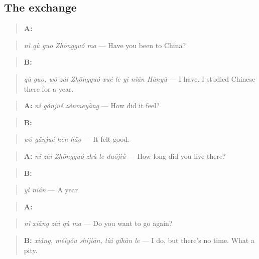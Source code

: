 \subsection*{The exchange}
\begin{quote}
\textbf{A:} 
\end{quote}

\begin{quote}
\emph{nǐ qù guo Zhōngguó ma} — Have you been to China?
\end{quote}

\begin{quote}
\textbf{B:}  
\end{quote}

\begin{quote}
\emph{qù guo, wǒ zài Zhōngguó xué le yì nián Hànyǔ} — I have. I studied Chinese there for a year.
\end{quote}

\begin{quote}
\textbf{A:} \emph{nǐ gǎnjué zěnmeyàng} — How did it feel?
\end{quote}

\begin{quote}
\textbf{B:} 
\end{quote}

\begin{quote}
\emph{wǒ gǎnjué hěn hǎo} — It felt good.
\end{quote}

\begin{quote}
\textbf{A:} \emph{nǐ zài Zhōngguó zhù le duōjiǔ} — How long did you live there?
\end{quote}

\begin{quote}
\textbf{B:} 
\end{quote}

\begin{quote}
\emph{yì nián} — A year.
\end{quote}

\begin{quote}
\textbf{A:} 
\end{quote}

\begin{quote}
\emph{nǐ xiǎng zài qù ma} — Do you want to go again?
\end{quote}

\begin{quote}
\textbf{B:} \emph{xiǎng, méiyǒu shíjiān, tài yíhàn le} — I do, but there's no time. What a pity.
\end{quote}

